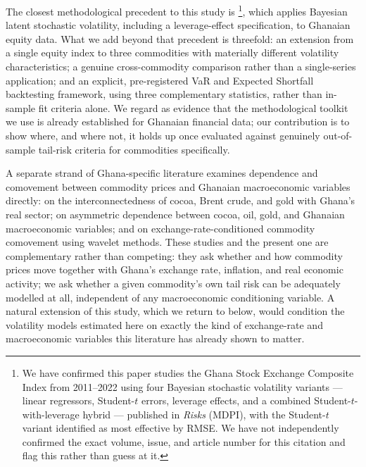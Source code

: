 \documentclass[preprint,12pt,authoryear]{elsarticle}
\begin{document}
The closest methodological precedent to this study is \citet{tweneboah2025}\footnote{We have confirmed this paper studies the Ghana Stock Exchange Composite Index from 2011--2022 using four Bayesian stochastic volatility variants --- linear regressors, Student-$t$ errors, leverage effects, and a combined Student-$t$-with-leverage hybrid --- published in \textit{Risks} (MDPI), with the Student-$t$ variant identified as most effective by RMSE. We have not independently confirmed the exact volume, issue, and article number for this citation and flag this rather than guess at it.}, which applies Bayesian latent stochastic volatility, including a leverage-effect specification, to Ghanaian equity data. What we add beyond that precedent is threefold: an extension from a single equity index to three commodities with materially different volatility characteristics; a genuine cross-commodity comparison rather than a single-series application; and an explicit, pre-registered VaR and Expected Shortfall backtesting framework, using three complementary statistics, rather than in-sample fit criteria alone. We regard \citet{tweneboah2025} as evidence that the methodological toolkit we use is already established for Ghanaian financial data; our contribution is to show where, and where not, it holds up once evaluated against genuinely out-of-sample tail-risk criteria for commodities specifically.

A separate strand of Ghana-specific literature examines dependence and comovement between commodity prices and Ghanaian macroeconomic variables directly: \citet{boateng2022} on the interconnectedness of cocoa, Brent crude, and gold with Ghana's real sector; \citet{yeboah2025} on asymmetric dependence between cocoa, oil, gold, and Ghanaian macroeconomic variables; and \citet{barson2023} on exchange-rate-conditioned commodity comovement using wavelet methods. These studies and the present one are complementary rather than competing: they ask whether and how commodity prices move together with Ghana's exchange rate, inflation, and real economic activity; we ask whether a given commodity's own tail risk can be adequately modelled at all, independent of any macroeconomic conditioning variable. A natural extension of this study, which we return to below, would condition the volatility models estimated here on exactly the kind of exchange-rate and macroeconomic variables this literature has already shown to matter.
\end{document}
